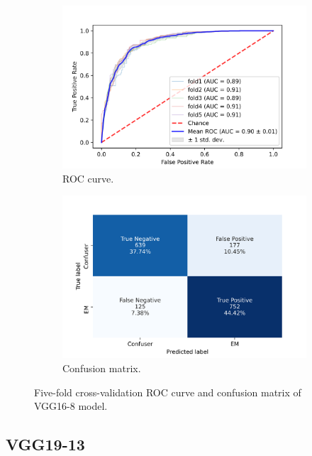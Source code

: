 \begin{figure}[h!]
	\centering
	\begin{subfigure}[b]{0.49\textwidth}
		\centering
		\includegraphics[width=\textwidth,keepaspectratio]{images/Supplement4/image1.png}
		\caption{ROC curve.}
	\end{subfigure}
	\hfill
	\begin{subfigure}[b]{0.49\textwidth}
		\centering
		\includegraphics[width=\textwidth,keepaspectratio]{images/Supplement4/image7.png}
		\caption{Confusion matrix.}
	\end{subfigure}
	\caption{Five-fold cross-validation ROC curve and confusion matrix of VGG16-8 model.}
\end{figure}

\vfill\clearpage
\subsection{VGG19-13}

